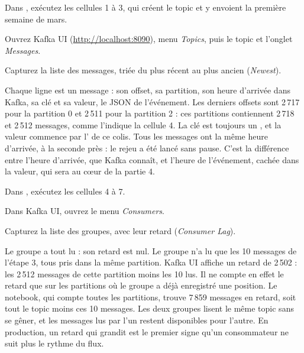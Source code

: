 \begin{obtenir}
  \item Dans , exécutez les cellules 1 à 3, qui créent le topic et y envoient la première semaine de mars.
  \item Ouvrez Kafka UI (\url{http://localhost:8090}), menu \emph{Topics}, puis le topic  et l'onglet \emph{Messages}.
  \item Capturez la liste des messages, triée du plus récent au plus ancien (\emph{Newest}).
\end{obtenir}
\begin{lecture}
Chaque ligne est un message : son offset, sa partition, son heure d'arrivée dans Kafka, sa clé et
sa valeur, le JSON de l'événement. Les derniers offsets sont 2\,717 pour la partition 0 et 2\,511
pour la partition 2 : ces partitions contiennent 2\,718 et 2\,512 messages, comme l'indique la
cellule 4. La clé est toujours un , et la valeur commence par l' de
ce colis. Tous les messages ont la même heure d'arrivée, à la seconde près : le rejeu a été lancé
sans pause. C'est la différence entre l'heure d'arrivée, que Kafka connaît, et l'heure de
l'événement, cachée dans la valeur, qui sera au cœur de la partie 4.
\end{lecture}

\begin{obtenir}
  \item Dans , exécutez les cellules 4 à 7.
  \item Dans Kafka UI, ouvrez le menu \emph{Consumers}.
  \item Capturez la liste des groupes, avec leur retard (\emph{Consumer Lag}).
\end{obtenir}
\begin{lecture}
Le groupe  a tout lu : son retard est nul. Le groupe
 n'a lu que les 10 messages de l'étape 3, tous pris dans la même partition. Kafka UI
affiche un retard de 2\,502 : les 2\,512 messages de cette partition moins les 10 lus. Il ne compte en
effet le retard que sur les partitions où le groupe a déjà enregistré une position. Le notebook, qui
compte toutes les partitions, trouve 7\,859 messages en retard, soit tout le topic moins ces 10
messages. Les deux groupes lisent le même topic sans se gêner, et les
messages lus par l'un restent disponibles pour l'autre. En production, un retard qui grandit est le
premier signe qu'un consommateur ne suit plus le rythme du flux.
\end{lecture}



